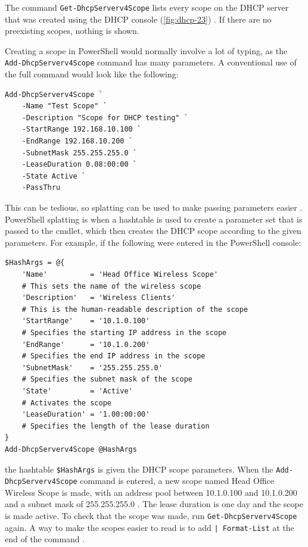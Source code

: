The command \texttt{Get-DhcpServerv4Scope} lists every scope on the DHCP server that was created using the DHCP console (\autoref{fig:dhcp-23}) \cite{sherry-dhcp-scope}. If there are no preexisting scopes, nothing is shown.


Creating a scope in PowerShell would normally involve a lot of typing, as the \texttt{Add-DhcpServerv4Scope} command has many parameters. A conventional use of the full command would look like the following:

\begin{lstlisting}
Add-DhcpServerv4Scope `
    -Name "Test Scope" `
    -Description "Scope for DHCP testing" `
    -StartRange 192.168.10.100 `
    -EndRange 192.168.10.200 `
    -SubnetMask 255.255.255.0 `
    -LeaseDuration 0.08:00:00 `
    -State Active `
    -PassThru
\end{lstlisting}

This can be tedious, so splatting can be used to make passing parameters easier \cite{listek-splatting}. PowerShell splatting is when a hashtable is used to create a parameter set that is passed to the cmdlet, which then creates the DHCP scope according to the given parameters. For example, if the following were entered in the PowerShell console:

\begin{lstlisting}
$HashArgs = @{
    'Name'          = 'Head Office Wireless Scope'
    # This sets the name of the wireless scope
    'Description'   = 'Wireless Clients'
    # This is the human-readable description of the scope
    'StartRange'    = '10.1.0.100'
    # Specifies the starting IP address in the scope
    'EndRange'      = '10.1.0.200'
    # Specifies the end IP address in the scope
    'SubnetMask'    = '255.255.255.0'
    # Specifies the subnet mask of the scope
    'State'         = 'Active'
    # Activates the scope
    'LeaseDuration' = '1.00:00:00'
    # Specifies the length of the lease duration
}
Add-DhcpServerv4Scope @HashArgs
\end{lstlisting}

the hashtable \texttt{\$HashArgs} is given the DHCP scope parameters. When the \texttt{Add-\allowbreak DhcpServerv4Scope} command is entered, a new scope named Head Office Wireless Scope is made, with an address pool between 10.1.0.100 and 10.1.0.200 and a subnet mask of 255.255.255.0 \cite{sherry-dhcp-scope}. The lease duration is one day and the scope is made active. To check that the scope was made, run \texttt{Get-DhcpServerv4Scope} again. A way to make the scopes easier to read is to add \texttt{| Format-List} at the end of the command \cite{sherry-dhcp-scope}.

